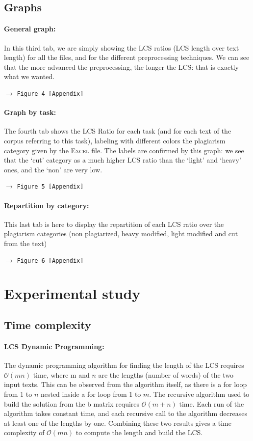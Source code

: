 \documentclass[a4paper,12pt]{article}
\newcommand{\see}[1]{\begin{flushright}$\rightarrow$ \texttt{#1 [Appendix]}\end{flushright}}
\newcommand{\bigO}{\mathcal{O}}
\newcommand{\seeFigure}[1]{\see{Figure #1}}
\begin{document}
		\subsection{Graphs}

			\paragraph{General graph:} In this third tab, we are simply showing the LCS ratios (LCS length over text length) for all the files, and for the different preprocessing techniques. We can see that the more advanced the preprocessing, the longer the LCS: that is exactly what we wanted.
			\seeFigure{4}

			\paragraph{Graph by task:} The fourth tab shows the LCS Ratio for each task (and for each text of the corpus referring to this task), labeling with different colors the plagiarism category given by the \textsc{Excel} file. The labels are confirmed by this graph: we see that the `cut' category as a much higher LCS ratio than the `light' and `heavy' ones, and the `non' are very low.
			\seeFigure{5}

			\paragraph{Repartition by category:} This last tab is here to display the repartition of each LCS ratio over the plagiarism categories (non plagiarized, heavy modified, light modified and cut from the text)
			\seeFigure{6}


	\newpage
	\section{Experimental study}
		\subsection{Time complexity}
			\paragraph{LCS Dynamic Programming:} The dynamic programming algorithm for finding the length of the LCS requires $\bigO(mn)$ time, where m and $n$ are the lengths (number of words) of the two input texts. This can be observed from the algorithm itself, as there is a for loop from 1 to $n$ nested inside a for loop from 1 to $m$. The recursive algorithm used to build the solution from the b matrix requires $\bigO(m+n)$ time. Each run of the algorithm takes constant time, and each recursive call to the algorithm decreases at least one of the lengths by one. Combining these two results gives a time complexity of $\bigO(mn)$ to compute the length and build the LCS.
\end{document}
